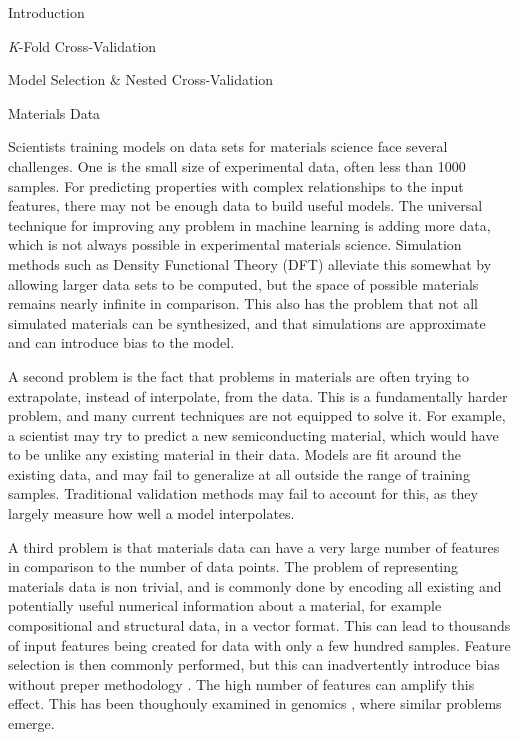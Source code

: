 \documentclass[onecolumn,abstract,paper=letter]{scrartcl}
\begin{document}
\begin{section}{Introduction}
\begin{subsection}{\textit{K}-Fold Cross-Validation}
\end{subsection}

\begin{subsection}{Model Selection \& Nested Cross-Validation}

\end{subsection}

\begin{subsection}{Materials Data}

Scientists training models on data sets for materials science face several challenges.
One is the small size of experimental data, often less than 1000 samples. 
For predicting properties with complex relationships to the input features, there may not be enough data to build useful models. 
The universal technique for improving any problem in machine learning is adding more data, which is not always possible in experimental materials science. 
Simulation methods such as Density Functional Theory (DFT) alleviate this somewhat by allowing larger data sets to be computed, but the space of possible materials remains nearly infinite in comparison. 
This also has the problem that not all simulated materials can be synthesized, and that simulations are approximate and can introduce bias to the model. 

A second problem is the fact that problems in materials are often trying to extrapolate, instead of interpolate, from the data.
This is a fundamentally harder problem, and many current techniques are not equipped to solve it. 
For example, a scientist may try to predict a new semiconducting material, which would have to be unlike any existing material in their data. 
Models are fit around the existing data, and may fail to generalize at all outside the range of training samples.
Traditional validation methods may fail to account for this, as they largely measure how well a model interpolates. 

A third problem is that materials data can have a very large number of features in comparison to the number of data points.
The problem of representing materials data is non trivial, and is commonly done by encoding all existing and potentially useful numerical information about a material, for example compositional and structural data, in a vector format. 
This can lead to thousands of input features being created for data with only a few hundred samples. 
Feature selection is then commonly performed, but this can inadvertently introduce bias without preper methodology \cite{cawley2010}.
The high number of features can amplify this effect.  
This has been thoughouly examined in genomics \cite{ambroise2002}, where similar problems emerge. 


\end{subsection}



\end{section}
\end{document}
